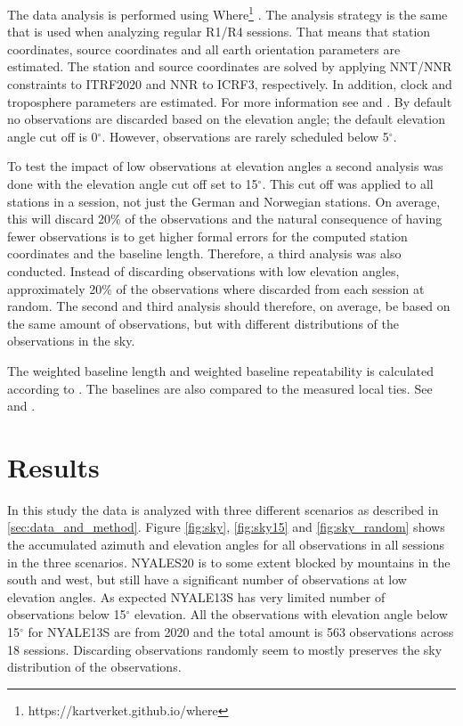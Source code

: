 \documentclass[twoside=semi,fontsize=12pt,paper=a4,titlepage=on]{kv_article}
\begin{document}
The data analysis is performed using Where\footnote{https://kartverket.github.io/where} \cite{hjelle2018}. The analysis strategy is the same that is used when analyzing regular R1/R4 sessions. That means that station coordinates, source coordinates and all earth orientation parameters are estimated. The station and source coordinates are solved by applying NNT/NNR constraints to ITRF2020 and NNR to ICRF3, respectively. In addition, clock and troposphere parameters are estimated. For more information see \cite{kirkvik2017b} and \cite{kirkvik2019}. By default no observations are discarded based on the elevation angle; the default elevation angle cut off is 0$^\circ$. However, observations are rarely scheduled below 5$^\circ$.

To test the impact of low observations at elevation angles a second analysis was done with the elevation angle cut off set to 15$^\circ$. This cut off was applied to all stations in a session, not just the German and Norwegian stations. On average, this will discard 20\% of the observations and the natural consequence of having fewer observations is to get higher formal errors for the computed station coordinates and the baseline length. Therefore, a third analysis was also conducted. Instead of discarding observations with low elevation angles, approximately 20\% of the observations where discarded from each session at random. The second and third analysis should therefore, on average, be based on the same amount of observations, but with different distributions of the observations in the sky.

The weighted baseline length and weighted baseline repeatability is calculated according to \cite{hofmeister2016}. The baselines are also compared to the measured local ties. See \cite{tangen2021} and \cite{schuler2018}.

\section{Results}
In this study the data is analyzed with three different scenarios as described in \ref{sec:data_and_method}. Figure \ref{fig:sky}, \ref{fig:sky15} and \ref{fig:sky_random} shows the accumulated azimuth and elevation angles for all observations in all sessions in the three scenarios. NYALES20 is to some extent blocked by mountains in the south and west, but still have a significant number of observations at low elevation angles. As expected NYALE13S has very limited number of observations below 15$^\circ$ elevation. All the observations with elevation angle below 15$^\circ$ for NYALE13S are from 2020 and the total amount is 563 observations across 18 sessions. Discarding observations randomly seem to mostly preserves the sky distribution of the observations.
\end{document}
